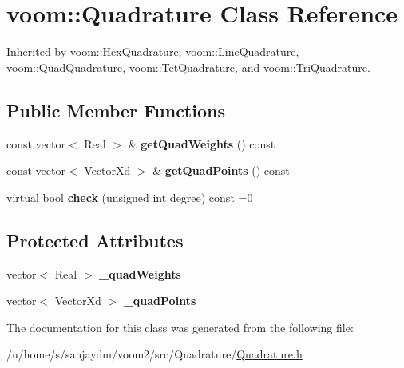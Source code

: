 \hypertarget{classvoom_1_1_quadrature}{
\section{voom::Quadrature Class Reference}
\label{classvoom_1_1_quadrature}
}


Inherited by \hyperlink{classvoom_1_1_hex_quadrature}{voom::HexQuadrature}, \hyperlink{classvoom_1_1_line_quadrature}{voom::LineQuadrature}, \hyperlink{classvoom_1_1_quad_quadrature}{voom::QuadQuadrature}, \hyperlink{classvoom_1_1_tet_quadrature}{voom::TetQuadrature}, and \hyperlink{classvoom_1_1_tri_quadrature}{voom::TriQuadrature}.\subsection*{Public Member Functions}
\begin{DoxyCompactItemize}
\item 
\hypertarget{classvoom_1_1_quadrature_a1aea9ddcd4f82b9b81d639ec111ba2ed}{
const vector$<$ Real $>$ \& {\bfseries getQuadWeights} () const }
\label{classvoom_1_1_quadrature_a1aea9ddcd4f82b9b81d639ec111ba2ed}

\item 
\hypertarget{classvoom_1_1_quadrature_a18a2ce35f8a3786a77259b7b7b589ef1}{
const vector$<$ VectorXd $>$ \& {\bfseries getQuadPoints} () const }
\label{classvoom_1_1_quadrature_a18a2ce35f8a3786a77259b7b7b589ef1}

\item 
\hypertarget{classvoom_1_1_quadrature_aca75eb4424793a057c6d27ca5194e3f0}{
virtual bool {\bfseries check} (unsigned int degree) const =0}
\label{classvoom_1_1_quadrature_aca75eb4424793a057c6d27ca5194e3f0}

\end{DoxyCompactItemize}
\subsection*{Protected Attributes}
\begin{DoxyCompactItemize}
\item 
\hypertarget{classvoom_1_1_quadrature_a1a022a3ab7fef537b0ede65787554602}{
vector$<$ Real $>$ {\bfseries \_\-quadWeights}}
\label{classvoom_1_1_quadrature_a1a022a3ab7fef537b0ede65787554602}

\item 
\hypertarget{classvoom_1_1_quadrature_a033763f1240f04e2fbe1b7272aa45c6c}{
vector$<$ VectorXd $>$ {\bfseries \_\-quadPoints}}
\label{classvoom_1_1_quadrature_a033763f1240f04e2fbe1b7272aa45c6c}

\end{DoxyCompactItemize}


The documentation for this class was generated from the following file:\begin{DoxyCompactItemize}
\item 
/u/home/s/sanjaydm/voom2/src/Quadrature/\hyperlink{_quadrature_8h}{Quadrature.h}\end{DoxyCompactItemize}
